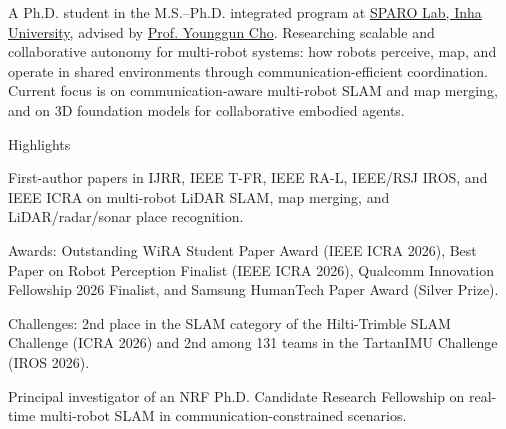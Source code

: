 
\begin{cvparagraph}
A Ph.D. student in the M.S.--Ph.D. integrated program at \href{https://sparolab.github.io/}{SPARO Lab, Inha University}, advised by \href{https://sites.google.com/site/ygchocv/home}{Prof. Younggun Cho}.
Researching scalable and collaborative autonomy for multi-robot systems: how robots perceive, map, and operate in shared environments through communication-efficient coordination.
Current focus is on communication-aware multi-robot SLAM and map merging, and on 3D foundation models for collaborative embodied agents.
\end{cvparagraph}

\cventry
  {}
  {Highlights\vspace{-0.3cm}}
  {}
  {}
  {
    \begin{cvitems}
      \item First-author papers in IJRR, IEEE T-FR, IEEE RA-L, IEEE/RSJ IROS, and IEEE ICRA on multi-robot LiDAR SLAM, map merging, and LiDAR/radar/sonar place recognition.
      \item Awards: Outstanding WiRA Student Paper Award (IEEE ICRA 2026), Best Paper on Robot Perception Finalist (IEEE ICRA 2026), Qualcomm Innovation Fellowship 2026 Finalist, and Samsung HumanTech Paper Award (Silver Prize).
      \item Challenges: 2nd place in the SLAM category of the Hilti-Trimble SLAM Challenge (ICRA 2026) and 2nd among 131 teams in the TartanIMU Challenge (IROS 2026).
      \item Principal investigator of an NRF Ph.D. Candidate Research Fellowship on real-time multi-robot SLAM in communication-constrained scenarios.
    \end{cvitems}
  }
